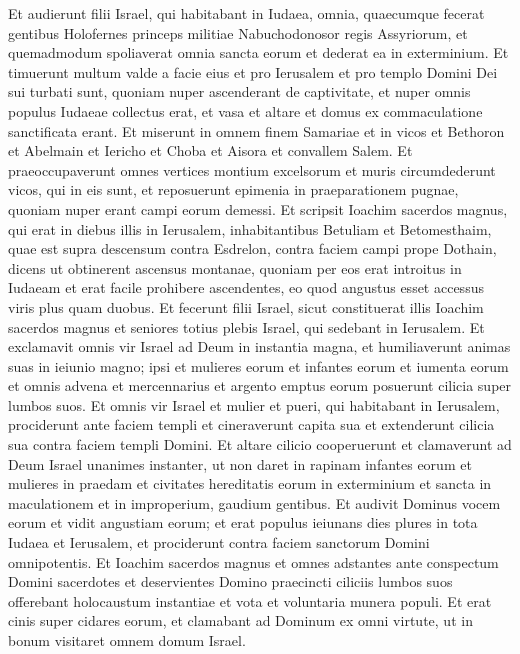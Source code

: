 \begin{biblechapter}  
\verse Et audierunt filii Israel, qui habitabant in Iudaea, omnia, quaecumque fecerat gentibus Holofernes princeps militiae Nabuchodonosor regis Assyriorum, et quemadmodum spoliaverat omnia sancta eorum et dederat ea in exterminium.  
\verse Et timuerunt multum valde a facie eius et pro Ierusalem et pro templo Domini Dei sui turbati sunt, 
\verse quoniam nuper ascenderant de captivitate, et nuper omnis populus Iudaeae collectus erat, et vasa et altare et domus ex commaculatione sanctificata erant. 
\verse Et miserunt in omnem finem Samariae et in vicos et Bethoron et Abelmain et Iericho et Choba et Aisora et convallem Salem. 
\verse Et praeoccupaverunt omnes vertices montium excelsorum et muris circumdederunt vicos, qui in eis sunt, et reposuerunt epimenia in praeparationem pugnae, quoniam nuper erant campi eorum demessi. 
\verse Et scripsit Ioachim sacerdos magnus, qui erat in diebus illis in Ierusalem, inhabitantibus Betuliam et Betomesthaim, quae est supra descensum contra Esdrelon, contra faciem campi prope Dothain, 
\verse dicens ut obtinerent ascensus montanae, quoniam per eos erat introitus in Iudaeam et erat facile prohibere ascendentes, eo quod angustus esset accessus viris plus quam duobus. 
\verse Et fecerunt filii Israel, sicut constituerat illis Ioachim sacerdos magnus et seniores totius plebis Israel, qui sedebant in Ierusalem. 
\verse Et exclamavit omnis vir Israel ad Deum in instantia magna, et humiliaverunt animas suas in ieiunio magno; 
\verse ipsi et mulieres eorum et infantes eorum et iumenta eorum et omnis advena et mercennarius et argento emptus eorum posuerunt cilicia super lumbos suos. 
\verse Et omnis vir Israel et mulier et pueri, qui habitabant in Ierusalem, prociderunt ante faciem templi et cineraverunt capita sua et extenderunt cilicia sua contra faciem templi Domini. 
\verse Et altare cilicio cooperuerunt et clamaverunt ad Deum Israel unanimes instanter, ut non daret in rapinam infantes eorum et mulieres in praedam et civitates hereditatis eorum in exterminium et sancta in maculationem et in improperium, gaudium gentibus. 
\verse Et audivit Dominus vocem eorum et vidit angustiam eorum; et erat populus ieiunans dies plures in tota Iudaea et Ierusalem, et prociderunt contra faciem sanctorum Domini omnipotentis. 
\verse Et Ioachim sacerdos magnus et omnes adstantes ante conspectum Domini sacerdotes et deservientes Domino praecincti ciliciis lumbos suos offerebant holocaustum instantiae et vota et voluntaria munera populi. 
\verse Et erat cinis super cidares eorum, et clamabant ad Dominum ex omni virtute, ut in bonum visitaret omnem domum Israel. 
\end{biblechapter}

